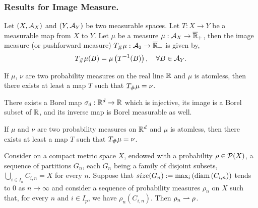 \subsubsection{Results for Image Measure.}
\begin{definition}
	Let $\left( X, \mathcal{A}_X \right)$  and $\left( Y, \mathcal{A}_Y \right)$ be two measurable spaces. Let $T:X\rightarrow Y$ be a measurable map from $X$ to $Y$. Let $\mu$ be a measure $\mu: \mathcal{A}_X\rightarrow \overline{\mathbb{R}}_+$, then the image measure (or pushforward measure) ${T}_{\#} \mu:\mathcal{A}_2\rightarrow \overline{\mathbb{R}}_+$ is given by,
	\begin{equation*}
	{T}_{\#} \mu(B) = \mu\left( T^{-1}(B) \right), \quad \forall B \in \mathcal{A}_Y.
	\end{equation*}
\end{definition}

\begin{lemma}
If $\mu$, $\nu$ are two probability measures on the real line $\mathbb{R}$ and $\mu$ is atomless, then there exists at least a map $T$ such that ${T}_{\#} \mu=\nu$.
\end{lemma}
	
\begin{lemma}
There exists a Borel map $\sigma_d: \mathbb{R}^d\rightarrow \mathbb{R}$ which is injective, its image is a Borel subset of $\mathbb{R}$, and its inverse map is Borel measurable as well.
\end{lemma}
		
\begin{theorem}
	If $\mu$ and $\nu$ are two probability measures on $\mathbb{R}^d$ and $\mu$ is atomless, then there exists at least a map $T$ such that ${T}_{\#} \mu=\nu$.
\end{theorem}
			
\begin{theorem}
	Consider on a compact metric space $X$, endowed with a probability $\rho \in \mathcal{P}(X)$, a sequence of partitions $G_n$, each $G_n$ being a family of disjoint subsets, $\bigcup_{i\in I_n}C_{i,n}=X$ for every $n$. Suppose that $size(G_n):=\max_i \left( \mathrm{diam}\left( C_{i,n} \right) \right)$ tends to $0$ as $n\rightarrow \infty$ and consider a sequence of probability measures $\rho_n$ on $X$ such that, for every $n$ and $i\in I_p$, we have $\rho_n(C_{i,n})$. Then $\rho_n\rightharpoonup\rho$.
\end{theorem}


